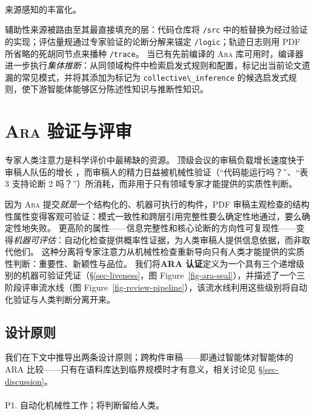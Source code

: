 \documentclass[
]{article}
\makeatletter
\let\oldparagraph\paragraph
\renewcommand{\paragraph}{
    \@ifstar
      \xxxParagraphStar
      \xxxParagraphNoStar
  }
\newcommand{\xxxParagraphStar}[1]{\oldparagraph*{#1}\mbox{}}
\newcommand{\xxxParagraphNoStar}[1]{\oldparagraph{#1}\mbox{}}
\newcommand{\passthrough}[1]{#1}
\theoremstyle{definition}
\newcommand{\ara}{\textsc{Ara}}
\makeatother
\begin{document}
\paragraph{来源感知的丰富化。}\label{sec-collective}

辅助性来源被路由至其最直接填充的层：代码仓库将
\passthrough{\lstinline!/src!}
中的桩替换为经过验证的实现；评估量规通过专家验证的论断分解来锚定
\passthrough{\lstinline!/logic!}；轨迹日志则用 PDF
所省略的死胡同节点来播种 \passthrough{\lstinline!/trace!}。
当已有先前编译的 \ara{}
库可用时，编译器进一步执行\emph{集体推断}：从同领域构件中检索启发式规则和配置，标记出当前论文遗漏的常见模式，并将其添加为标记为
\passthrough{\lstinline!collective\_inference!}
的候选启发式规则，使下游智能体能够区分陈述性知识与推断性知识。

\FloatBarrier

\section{\texorpdfstring{\ara{}
验证与评审}{ 验证与评审}}\label{sec-review-system}

专家人类注意力是科学评价中最稀缺的资源。
顶级会议的审稿负载增长速度快于审稿人队伍的增长
\citep{aczel2021billiondollar}，而审稿人的精力日益被机械性验证（``代码能运行吗？''、``表
3 支持论断 2 吗？''）所消耗，而非用于只有领域专家才能提供的实质性判断。

因为 \ara{} 提交\emph{就是}一个结构化的、机器可执行的构件，PDF
审稿主观检查的结构性属性变得客观可验证：模式一致性和跨层引用完整性要么确定性地通过，要么确定性地失败。
更高阶的属性------信息完整性和核心论断的方向性可复现性------变得\emph{机器可评估}：自动化检查提供概率性证据，为人类审稿人提供信息依据，而非取代他们。
这种分离将专家注意力从机械性检查重新导向只有人类才能提供的实质性判断：重要性、新颖性与品位。
我们将\textbf{ARA
认证}定义为一个具有三个递增级别的机器可验证凭证（\S\ref{sec-liveness}，图
Figure~\ref{fig-ara-seal}），并描述了一个三阶段评审流水线（图
Figure~\ref{fig-review-pipeline}），该流水线利用这些级别将自动化验证与人类判断分离开来。

\subsection{设计原则}\label{sec-review-principles}

我们在下文中推导出两条设计原则；跨构件审稿------即通过智能体对智能体的
ARA 比较------只有在语料库达到临界规模时才有意义，相关讨论见
\S\ref{sec-discussion}。

\paragraph{P1.
自动化机械性工作；将判断留给人类。}\label{p1.-ux81eaux52a8ux5316ux673aux68b0ux6027ux5de5ux4f5cux5c06ux5224ux65adux7559ux7ed9ux4ebaux7c7b}
\end{document}
